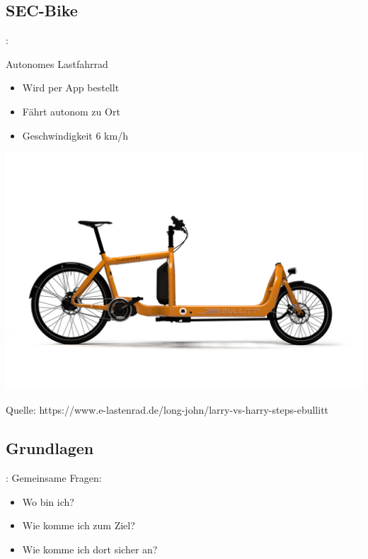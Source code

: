 \documentclass{beamer}
\begin{document}
\subsection{SEC-Bike}
\begin{frame}{\insertsection: \insertsubsection}
\begin{minipage}{0.4\linewidth}
	Autonomes Lastfahrrad
	\begin{itemize}
		\item Wird per App bestellt
		\item Fährt autonom zu Ort
		\item Geschwindigkeit 6 km/h
	\end{itemize}
\end{minipage} \quad
\begin{minipage}{0.5\linewidth}
	\includegraphics[width=\linewidth]{lastenrad}
	
	{\tiny Quelle: https://www.e-lastenrad.de/long-john/larry-vs-harry-steps-ebullitt}
\end{minipage}
\end{frame}

\subsection{Grundlagen}
\begin{frame}{\insertsection: \insertsubsection}
	Gemeinsame Fragen:
	\begin{itemize}
		\item Wo bin ich?
		\item Wie komme ich zum Ziel?
		\item Wie komme ich dort sicher an?
	\end{itemize}
\end{frame}
\end{document}
